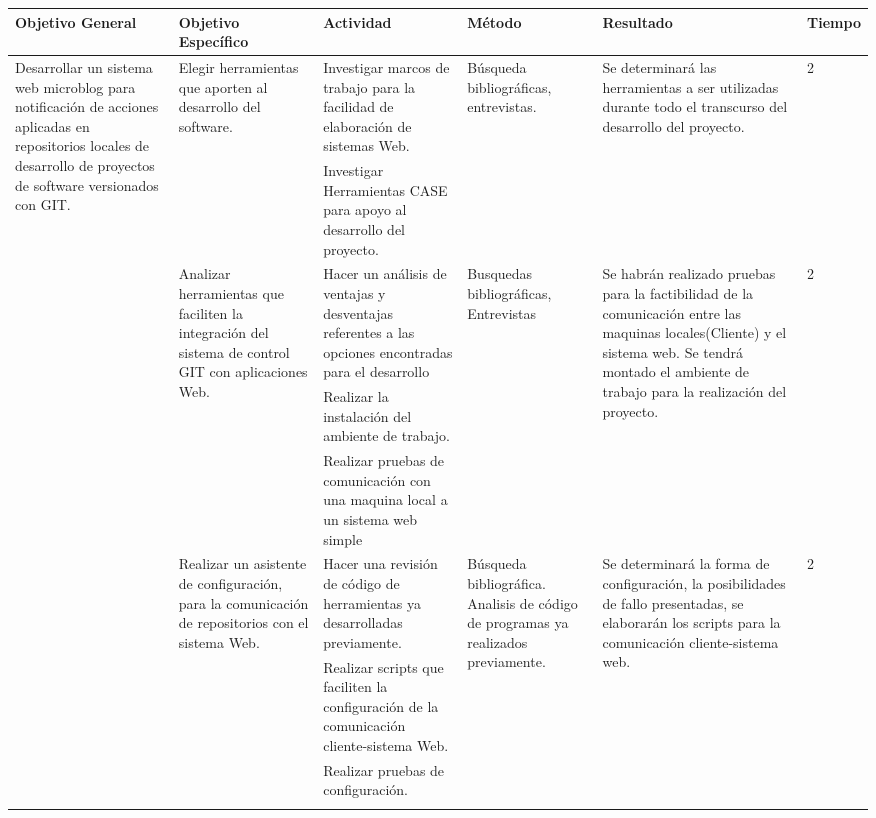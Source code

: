 \begin{center}
\begin{longtable}{|p{2cm}|p{2cm}|p{2cm}|p{2cm}|p{2cm}|p{1.3cm}|}
\hline
Objetivo General & Objetivo Específico & Actividad & Método & Resultado & Tiempo\\
\hline
\multirow{13}{2cm}{Desarrollar un sistema web microblog para notificación de acciones aplicadas en repositorios locales de desarrollo de proyectos de software versionados con GIT.} & 

\multirow{2}{2cm}{Elegir herramientas que aporten al desarrollo del software.} & {Investigar marcos de trabajo para la facilidad de elaboración de sistemas Web.} & \multirow{2}{2cm}{Búsqueda bibliográficas, entrevistas.} &\multirow{2}{2cm}{Se determinará las herramientas a ser utilizadas durante todo el transcurso del desarrollo del proyecto.}& \multirow{2}{2cm}{2}\\\cline{3-3}
& & {Investigar Herramientas CASE para apoyo al desarrollo del proyecto.}&&&\\\cline{2-6}

& \multirow{3}{2cm}{Analizar herramientas que faciliten la integración del sistema de control GIT con aplicaciones Web.}&{Hacer un análisis de ventajas y desventajas referentes a las opciones encontradas para el desarrollo}&\multirow{3}{2cm}{Busquedas bibliográficas, Entrevistas}&\multirow{3}{2cm}{Se habrán realizado pruebas para la factibilidad de la comunicación entre las maquinas locales(Cliente) y el sistema web.
Se tendrá montado el ambiente de trabajo para la realización del proyecto.}&\multirow{3}{2cm}{2}\\\cline{3-3}
& &{Realizar la instalación del ambiente de trabajo.}&&&\\\cline{3-3}
& &{Realizar pruebas de comunicación con una maquina local a un sistema web simple}&&&\\\cline{2-6}
& \multirow{3}{2cm}{Realizar un asistente de configuración, para la comunicación de repositorios con el sistema Web.}&{Hacer una revisión de código de herramientas ya desarrolladas previamente.}&\multirow{3}{2cm}{Búsqueda bibliográfica. Analisis de código de programas ya realizados previamente.}&\multirow{3}{2cm}{Se determinará la forma de configuración, la posibilidades de fallo presentadas, se elaborarán los scripts para la comunicación cliente-sistema web.}&\multirow{3}{2cm}{2}\\\cline{3-3}
& &{Realizar scripts que faciliten la configuración de la comunicación cliente-sistema Web.}&&&\\\cline{3-3}
& &{Realizar pruebas de configuración.}&&&\\\cline{2-6}


\end{longtable}
\end{center}

